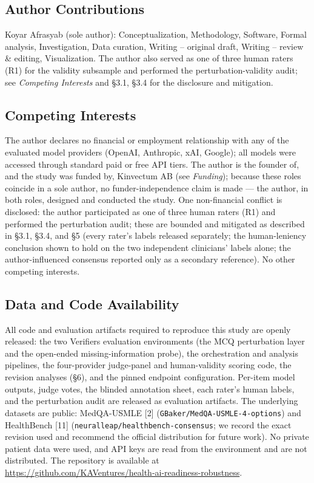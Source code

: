 \documentclass[
  11pt,
]{article}
\begin{document}
\subsection{Author Contributions}\label{author-contributions}

Koyar Afrasyab (sole author): Conceptualization, Methodology, Software,
Formal analysis, Investigation, Data curation, Writing -- original
draft, Writing -- review \& editing, Visualization. The author also
served as one of three human raters (R1) for the validity subsample and
performed the perturbation-validity audit; see \emph{Competing
Interests} and §3.1, §3.4 for the disclosure and mitigation.

\subsection{Competing Interests}\label{competing-interests}

The author declares no financial or employment relationship with any of
the evaluated model providers (OpenAI, Anthropic, xAI, Google); all
models were accessed through standard paid or free API tiers. The author
is the founder of, and the study was funded by, Kinvectum AB (see
\emph{Funding}); because these roles coincide in a sole author, no
funder-independence claim is made --- the author, in both roles,
designed and conducted the study. One non-financial conflict is
disclosed: the author participated as one of three human raters (R1) and
performed the perturbation audit; these are bounded and mitigated as
described in §3.1, §3.4, and §5 (every rater's labels released
separately; the human-leniency conclusion shown to hold on the two
independent clinicians' labels alone; the author-influenced consensus
reported only as a secondary reference). No other competing interests.

\subsection{Data and Code
Availability}\label{data-and-code-availability}

All code and evaluation artifacts required to reproduce this study are
openly released: the two Verifiers evaluation environments (the MCQ
perturbation layer and the open-ended missing-information probe), the
orchestration and analysis pipelines, the four-provider judge-panel and
human-validity scoring code, the revision analyses (§6), and the pinned
endpoint configuration. Per-item model outputs, judge votes, the blinded
annotation sheet, each rater's human labels, and the perturbation audit
are released as evaluation artifacts. The underlying datasets are
public: MedQA-USMLE {[}2{]} (\texttt{GBaker/MedQA-USMLE-4-options}) and
HealthBench {[}11{]} (\texttt{neuralleap/healthbench-consensus}; we
record the exact revision used and recommend the official distribution
for future work). No private patient data were used, and API keys are
read from the environment and are not distributed. The repository is
available at
\url{https://github.com/KAVentures/health-ai-readiness-robustness}.
\end{document}
